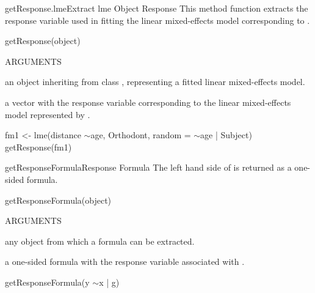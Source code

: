 \documentclass[pdftex]{article} \usepackage{url,graphicx}
\renewcommand{\Twiddle}{\mbox{\(\sim\)}}
\begin{document}
\begin{Helpfile}{getResponse.lme}{Extract lme Object Response}
This method function extracts the response variable used in fitting
the linear mixed-effects model corresponding to .
\begin{Example}
getResponse(object)
\end{Example}
\begin{Argument}{ARGUMENTS}
\item[\Co{object:}]
an object inheriting from class , representing
a fitted linear mixed-effects model.
\end{Argument}
a vector with the response variable corresponding to the linear
mixed-effects model represented by .
\need 15pt
\vspace{-16pt} 
\begin{Example}
fm1 <- lme(distance \Twiddle age, Orthodont, random = \Twiddle age | Subject)
getResponse(fm1)
\end{Example}
\end{Helpfile}
\begin{Helpfile}{getResponseFormula}{Response Formula}
The left hand side of  is returned as a
one-sided formula.
\begin{Example}
getResponseFormula(object)
\end{Example}
\begin{Argument}{ARGUMENTS}
\item[\Co{object:}]
any object from which a formula can be extracted.
\end{Argument}
a one-sided formula with the response variable associated with
.
\need 15pt
\vspace{-16pt} 
\begin{Example}
getResponseFormula(y \Twiddle x | g)
\end{Example}
\end{Helpfile}
\end{document}
